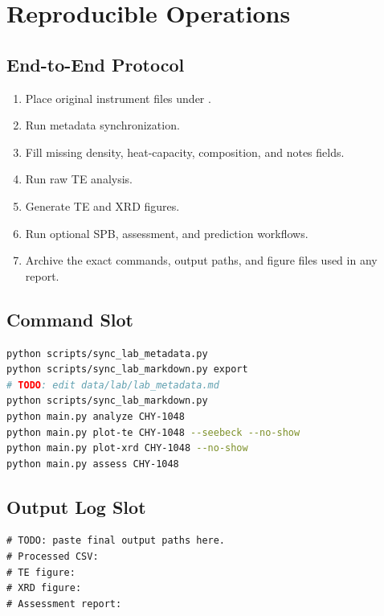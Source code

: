 \chapter{Reproducible Operations}

\section{End-to-End Protocol}

\begin{enumerate}[leftmargin=*]
  \item Place original instrument files under .
  \item Run metadata synchronization.
  \item Fill missing density, heat-capacity, composition, and notes fields.
  \item Run raw TE analysis.
  \item Generate TE and XRD figures.
  \item Run optional SPB, assessment, and prediction workflows.
  \item Archive the exact commands, output paths, and figure files used in any
  report.
\end{enumerate}

\section{Command Slot}

\begin{lstlisting}[language=bash,caption={End-to-end workflow command slot.}]
python scripts/sync_lab_metadata.py
python scripts/sync_lab_markdown.py export
# TODO: edit data/lab/lab_metadata.md
python scripts/sync_lab_markdown.py
python main.py analyze CHY-1048
python main.py plot-te CHY-1048 --seebeck --no-show
python main.py plot-xrd CHY-1048 --no-show
python main.py assess CHY-1048
\end{lstlisting}

\section{Output Log Slot}

\begin{lstlisting}[caption={End-to-end output log slot.}]
# TODO: paste final output paths here.
# Processed CSV:
# TE figure:
# XRD figure:
# Assessment report:
\end{lstlisting}
